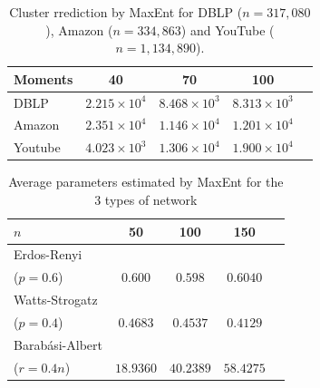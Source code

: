 \documentclass{article}
\begin{document}
\begin{table}[t]
	\caption{Cluster rrediction by MaxEnt for DBLP ($n=317,080$), Amazon ($n=334,863$) and YouTube ($n=1,134,890$). }	\label{table:largedata}
	\begin{center}
		\begin{small}
			\begin{sc}
				\begin{tabular}{lcccr}
					\toprule
					Moments  & 40  & 70  & 100 \\
					\midrule
					DBLP    & $ 2.215\times 10^{4}$   & $8.468 \times 10^{3}$  & $8.313\times 10^{3}$   \\
					Amazon & $2.351\times 10^{4}$   & $1.146\times 10^{4}$   & $1.201\times 10^{4}$   \\
					Youtube & $4.023\times 10^{3}$   & $1.306\times 10^{4}$   & $1.900\times 10^{4}$   \\
					\bottomrule
				\end{tabular}
			\end{sc}
		\end{small}
	\end{center}
	\vskip -0.1in
\end{table}

\begin{table}[t]
	\caption{Average parameters estimated by MaxEnt for the 3 types of network }\label{learn_synnet_para}
	\begin{center}
		\begin{small}
			\begin{sc}
				\begin{tabular}{lcccr}
					\toprule
					$n$ & 50  & 100  & 150 \\
					\midrule
					Erdos-Renyi \\($p=0.6$)     & $0.600$   & $0.598$  & $ 0.6040$   \\
					Watts-Strogatz \\($p=0.4$)  & $0.4683$   & $0.4537$   & $0.4129$   \\
					Barabási-Albert  \\($r=0.4n$)   & $18.9360$ & $40.2389$  & $58.4275$   \\
					\bottomrule
				\end{tabular}
			\end{sc}
		\end{small}
	\end{center}
	\vskip -0.1in
\end{table}
\end{document}
